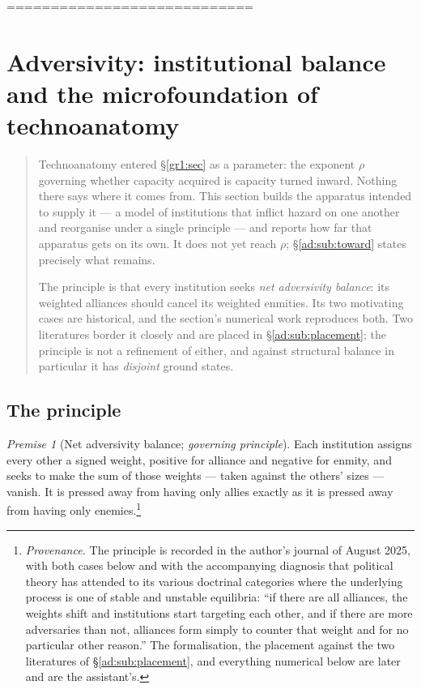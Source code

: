 \documentclass[11pt]{article}
\numberwithin{equation}{section}
\theoremstyle{plain}
\theoremstyle{definition}
\theoremstyle{remark}
\newtheorem{premise}{Premise}
\begin{document}
 ============================

\section{Adversivity: institutional balance and the microfoundation of
technoanatomy}\label{ad:sec}

\begin{quote}\small
Technoanatomy entered \S\ref{gr1:sec} as a parameter: the exponent
$\rho$ governing whether capacity acquired is capacity turned inward.
Nothing there says where it comes from. This section builds the
apparatus intended to supply it --- a model of institutions that
inflict hazard on one another and reorganise under a single principle
--- and reports how far that apparatus gets on its own. It does not yet
reach $\rho$; \S\ref{ad:sub:toward} states precisely what remains.

The principle is that every institution seeks \emph{net adversivity
balance}: its weighted alliances should cancel its weighted enmities.
Its two motivating cases are historical, and the section's numerical
work reproduces both. Two literatures border it closely and are placed
in \S\ref{ad:sub:placement}; the principle is not a refinement of
either, and against structural balance in particular it has
\emph{disjoint} ground states.
\end{quote}

\subsection{The principle}\label{ad:sub:principle}

\begin{premise}[Net adversivity balance; \emph{governing principle}]
\label{ad:phi:balance}
Each institution assigns every other a signed weight, positive for
alliance and negative for enmity, and seeks to make the sum of those
weights --- taken against the others' sizes --- vanish. It is pressed
away from having only allies exactly as it is pressed away from having
only enemies.\footnote{%
\emph{Provenance.} The principle is recorded in the author's journal of
August 2025, with both cases below and with the accompanying diagnosis
that political theory has attended to its various doctrinal categories
where the underlying process is one of stable and unstable equilibria:
``if there are all alliances, the weights shift and institutions start
targeting each other, and if there are more adversaries than not,
alliances form simply to counter that weight and for no particular other
reason.'' The formalisation, the placement against the two literatures
of \S\ref{ad:sub:placement}, and everything numerical below are later
and are the assistant's.}
\end{premise}
\end{document}
